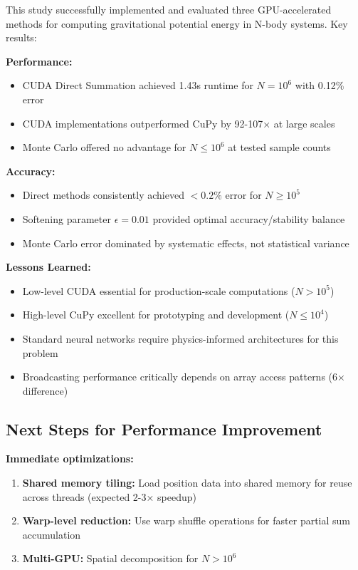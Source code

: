 \documentclass[11pt,a4paper]{article}
\begin{document}
This study successfully implemented and evaluated three GPU-accelerated methods for computing gravitational potential energy in N-body systems. Key results:

\textbf{Performance:}
\begin{itemize}
\item CUDA Direct Summation achieved 1.43s runtime for $N=10^6$ with 0.12\% error
\item CUDA implementations outperformed CuPy by 92-107× at large scales
\item Monte Carlo offered no advantage for $N \leq 10^6$ at tested sample counts
\end{itemize}

\textbf{Accuracy:}
\begin{itemize}
\item Direct methods consistently achieved $<0.2\%$ error for $N \geq 10^5$
\item Softening parameter $\epsilon=0.01$ provided optimal accuracy/stability balance
\item Monte Carlo error dominated by systematic effects, not statistical variance
\end{itemize}

\textbf{Lessons Learned:}
\begin{itemize}
\item Low-level CUDA essential for production-scale computations ($N > 10^5$)
\item High-level CuPy excellent for prototyping and development ($N \leq 10^4$)
\item Standard neural networks require physics-informed architectures for this problem
\item Broadcasting performance critically depends on array access patterns (6× difference)
\end{itemize}

\subsection{Next Steps for Performance Improvement}

\textbf{Immediate optimizations:}
\begin{enumerate}
\item \textbf{Shared memory tiling:} Load position data into shared memory for reuse across threads (expected 2-3× speedup)
\item \textbf{Warp-level reduction:} Use warp shuffle operations for faster partial sum accumulation
\item \textbf{Multi-GPU:} Spatial decomposition for $N > 10^6$
\end{enumerate}
\end{document}
